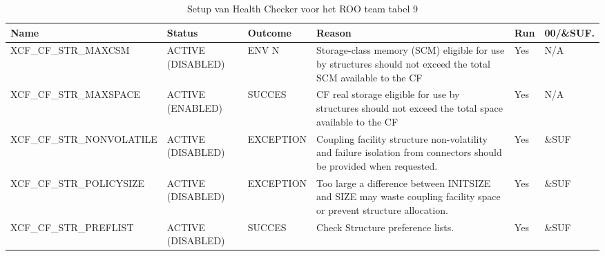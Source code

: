 \begin{landscape}
	\begin{table}[h]
		\begin{tabular}{|l|p{2.3cm}|l|p{4.5cm}|l|l|}
			\hline
			\textbf{Name}                       & \textbf{Status}   & \textbf{Outcome} & \textbf{Reason}    & \textbf{Run} &	\textbf{00/\&SUF.} \\ \hline
			XCF\_CF\_STR\_MAXCSM      & ACTIVE (DISABLED) & ENV N     & Storage-class memory (SCM) eligible for use by structures should   not exceed the   total SCM available to the CF          & Yes & N/A   \\ \hline
			XCF\_CF\_STR\_MAXSPACE    & ACTIVE (ENABLED)  & SUCCES    & CF real   storage eligible for use by structures should not exceed the total    space   available to the CF                & Yes & N/A   \\ \hline
			XCF\_CF\_STR\_NONVOLATILE & ACTIVE (DISABLED) & EXCEPTION & Coupling   facility structure non-volatility and failure isolation from connectors    should   be provided when requested. & Yes & \&SUF \\ \hline
			XCF\_CF\_STR\_POLICYSIZE  & ACTIVE (DISABLED) & EXCEPTION & Too   large a difference between INITSIZE and SIZE may waste coupling facility    space or prevent structure allocation.   & Yes & \&SUF \\ \hline
			XCF\_CF\_STR\_PREFLIST    & ACTIVE (DISABLED) & SUCCES    & Check   Structure preference lists.                                                                                        & Yes & \&SUF \\ \hline
		\end{tabular}
		\caption[Health Checker ROO team tabel 9]{Setup van Health Checker voor het ROO team tabel 9}
		\label{tbl:ROO Team Tabel 9}
	\end{table}
\end{landscape}

